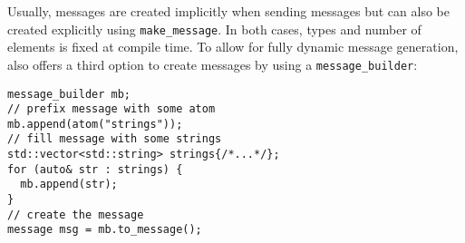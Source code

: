 Usually, messages are created implicitly when sending messages but can also be created explicitly using \lstinline^make_message^.
In both cases, types and number of elements is fixed at compile time.
To allow for fully dynamic message generation, \lib also offers a third option to create messages by using a \lstinline^message_builder^:

\begin{lstlisting}
message_builder mb;
// prefix message with some atom
mb.append(atom("strings"));
// fill message with some strings
std::vector<std::string> strings{/*...*/};
for (auto& str : strings) {
  mb.append(str);
}
// create the message
message msg = mb.to_message();
\end{lstlisting}
